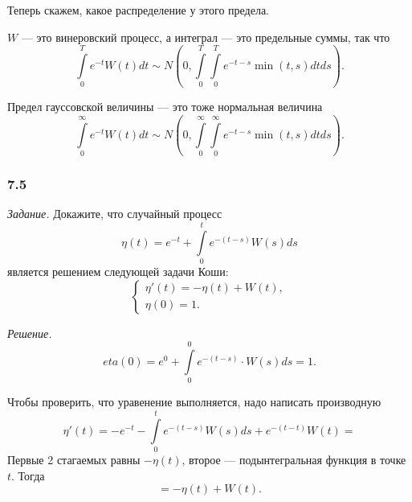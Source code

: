 Теперь скажем, какое распределение у этого предела.

$W$ --- это винеровский процесс, а интеграл --- это предельные суммы, так что
$$ \int \limits_0^T e^{-t} W \left( t \right) dt \sim
  N \left( 0, \int \limits_0^T \int \limits_0^T e^{-t-s} \min \left( t, s \right) dtds \right).$$

Предел гауссовской величины --- это тоже нормальная величина
$$ \int \limits_0^{ \infty } e^{-t} W \left( t \right) dt \sim
  N \left(
    0, \int \limits_0^{ \infty } \int \limits_0^{ \infty } e^{-t-s} \min \left( t, s \right) dtds
  \right).$$

\subsubsection*{7.5}

\textit{Задание.}
Докажите, что случайный процесс
$$ \eta \left( t \right) =
  e^{-t} + \int \limits_0^t e^{-\left( t - s \right) } W \left( s \right) ds$$
является решением следующей задачи Коши:
$$ \begin{cases}
    \eta' \left( t \right) = -\eta \left( t \right) + W \left( t \right), \\
    \eta \left( 0 \right) = 1.
  \end{cases}$$

\textit{Решение.}
$$ eta \left( 0 \right) =
  e^0 + \int \limits_0^0 e^{-\left( t - s \right) } \cdot W \left( s \right) ds = 1.$$

Чтобы проверить, что уравенение выполняется, надо написать производную
$$ \eta' \left( t \right) =
  -e^{-t} - \int \limits_0^t e^{-\left( t - s \right) } W \left( s \right) ds +
  e^{-\left( t - t \right) } W \left( t \right) =$$
Первые 2 стагаемых равны $-\eta \left( t \right) $, второе --- подынтегральная функция в точке $t$.
Тогда
$$= -\eta \left( t \right) + W \left( t \right).$$
